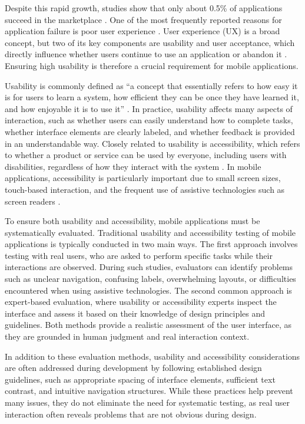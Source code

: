 \documentclass[acmsmall,nonacm]{acmart}
\begin{document}
Despite this rapid growth, studies show that only about 0.5\% of applications succeed in the marketplace \cite{weichbroth2019usability_model}. One of the most frequently reported reasons for application failure is poor user experience \cite{lu2021ux_mobile_apps}. User experience (UX) is a broad concept, but two of its key components are usability and user acceptance, which directly influence whether users continue to use an application or abandon it \cite{lu2021ux_mobile_apps}. Ensuring high usability is therefore a crucial requirement for mobile applications.

Usability is commonly defined as ``a concept that essentially refers to how easy it is for users to learn a system, how efficient they can be once they have learned it, and how enjoyable it is to use it'' \cite{nielsen1994usability_inspection}. In practice, usability affects many aspects of interaction, such as whether users can easily understand how to complete tasks, whether interface elements are clearly labeled, and whether feedback is provided in an understandable way. Closely related to usability is accessibility, which refers to whether a product or service can be used by everyone, including users with disabilities, regardless of how they interact with the system \cite{idf_accessibility}. In mobile applications, accessibility is particularly important due to small screen sizes, touch-based interaction, and the frequent use of assistive technologies such as screen readers \cite{idf_accessibility}.

To ensure both usability and accessibility, mobile applications must be systematically evaluated. Traditional usability and accessibility testing of mobile applications is typically conducted in two main ways. The first approach involves testing with real users, who are asked to perform specific tasks while their interactions are observed. During such studies, evaluators can identify problems such as unclear navigation, confusing labels, overwhelming layouts, or difficulties encountered when using assistive technologies. The second common approach is expert-based evaluation, where usability or accessibility experts inspect the interface and assess it based on their knowledge of design principles and guidelines. Both methods provide a realistic assessment of the user interface, as they are grounded in human judgment and real interaction context.

In addition to these evaluation methods, usability and accessibility considerations are often addressed during development by following established design guidelines, such as appropriate spacing of interface elements, sufficient text contrast, and intuitive navigation structures. While these practices help prevent many issues, they do not eliminate the need for systematic testing, as real user interaction often reveals problems that are not obvious during design.
\end{document}
